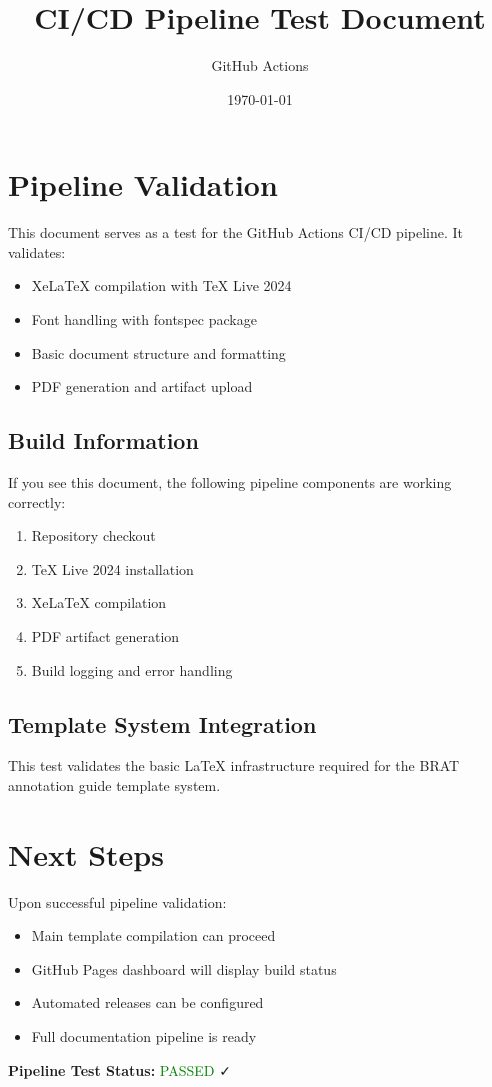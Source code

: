\documentclass[11pt,a4paper]{article}
\title{CI/CD Pipeline Test Document}
\author{GitHub Actions}
\date{\today}
\begin{document}
\maketitle

\section{Pipeline Validation}

This document serves as a test for the GitHub Actions CI/CD pipeline. It validates:

\begin{itemize}
    \item XeLaTeX compilation with TeX Live 2024
    \item Font handling with fontspec package
    \item Basic document structure and formatting
    \item PDF generation and artifact upload
\end{itemize}

\subsection{Build Information}

If you see this document, the following pipeline components are working correctly:

\begin{enumerate}
    \item Repository checkout
    \item TeX Live 2024 installation
    \item XeLaTeX compilation
    \item PDF artifact generation
    \item Build logging and error handling
\end{enumerate}

\subsection{Template System Integration}

This test validates the basic LaTeX infrastructure required for the BRAT annotation guide template system.

\section{Next Steps}

Upon successful pipeline validation:
\begin{itemize}
    \item Main template compilation can proceed
    \item GitHub Pages dashboard will display build status
    \item Automated releases can be configured
    \item Full documentation pipeline is ready
\end{itemize}

\textbf{Pipeline Test Status:} \textcolor{green}{PASSED} ✓
\end{document}

